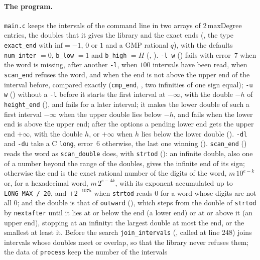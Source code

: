 \paragraph{The program.} \verb|main.c| keeps the intervals of the command line in two arrays of
$2\,\mathrm{maxDegree}$ entries, the doubles that it gives the library and the exact ends
(, the type \verb|exact_end| with $\mathrm{inf} = -1$, $0$ or $1$ and a GMP
rational $q$), with the defaults \verb|num_inter| $= 0$, \verb|b_low| $= 1$ and \verb|b_high| $= H$
(, ). \verb|-l w| ()
fails with error~7 when the word is missing, after another \verb|-l|, when $100$ intervals have been
read, when \verb|scan_end| refuses the word, and when the end is not above the upper end of the
interval before, compared exactly (\verb|cmp_end|, , two infinities of one
sign equal); \verb|-u w| () without a \verb|-l| before it starts the first
interval at $-\infty$, with the double $-h$ of \verb|height_end| (), and
fails for a later interval; it makes the lower double of such a first interval $-\infty$ when the
upper double lies below $-h$, and fails when the lower end is above the upper end; after the options
a pending lower end gets the upper end $+\infty$, with the double $h$, or $+\infty$ when $h$ lies
below the lower double (). \verb|-dl| and \verb|-du| take a C \verb|long|,
error~6 otherwise, the last one winning (). \verb|scan_end|
() reads the word as \verb|scan_double| does, with \verb|strtod|
(): an infinite double, also one of a number beyond the range of the
doubles, gives the infinite end of its sign; otherwise the end is the exact rational number of the
digits of the word, $m\,10^{e - k}$ or, for a hexadecimal word, $m\,2^{e - 4k}$, with its exponent
accumulated up to \verb|LONG_MAX / 20|, and $\pm 2^{-1075}$ when \verb|strtod| reads $0$ for a word
whose digits are not all $0$; and the double is that of \verb|outward| (),
which steps from the double of \verb|strtod| by \verb|nextafter| until it lies at or below the end
(a lower end) or at or above it (an upper end), stopping at an infinity: the largest double at most
the end, or the smallest at least it. Before the search \verb|join_intervals|
(, called at line 248) joins intervals whose doubles meet or overlap, so
that the library never refuses them; the data of \verb|process| keep the number of the intervals
